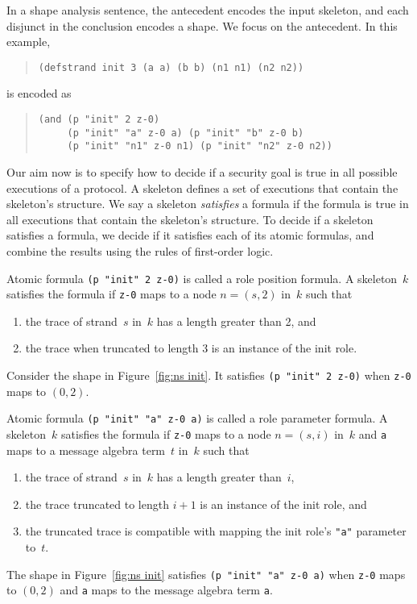 \documentclass[12pt]{article}
\begin{document}
In a shape analysis sentence, the antecedent encodes the input
skeleton, and each disjunct in the conclusion encodes a shape.
We focus on the antecedent.  In this example,

\begin{quote}
\begin{verbatim}
(defstrand init 3 (a a) (b b) (n1 n1) (n2 n2))
\end{verbatim}
\end{quote}
is encoded as
\begin{quote}
\begin{verbatim}
(and (p "init" 2 z-0)
     (p "init" "a" z-0 a) (p "init" "b" z-0 b)
     (p "init" "n1" z-0 n1) (p "init" "n2" z-0 n2))
\end{verbatim}
\end{quote}

Our aim now is to specify how to decide if a security goal is true in
all possible executions of a protocol.  A skeleton defines a set of
executions that contain the skeleton's structure.  We say a skeleton
\emph{satisfies} a formula if the formula is true in all executions
that contain the skeleton's structure.  To decide if a skeleton
satisfies a formula, we decide if it satisfies each of its atomic
formulas, and combine the results using the rules of first-order
logic.

Atomic formula \texttt{(p "init" 2 z-0)} is called a role position
formula.  A skeleton~$k$ satisfies the formula if \texttt{z-0} maps to
a node $n=(s,2)$ in~$k$ such that
\begin{enumerate}
\item the trace of strand~$s$ in~$k$ has a length greater than 2, and
\item the trace when truncated to length 3 is an instance of the init
  role.
\end{enumerate}
Consider the shape in Figure~\ref{fig:ns
  init}.  It satisfies \texttt{(p "init" 2 z-0)} when \texttt{z-0}
maps to $(0,2)$.

Atomic formula \texttt{(p "init" "a" z-0 a)} is called a role
parameter formula.  A skeleton~$k$ satisfies the formula if
\texttt{z-0} maps to a node $n=(s,i)$ in~$k$ and \texttt{a} maps to a
message algebra term~$t$ in~$k$ such that
\begin{enumerate}
\item the trace of strand~$s$ in~$k$ has a length greater than~$i$,
\item the trace truncated to length $i+1$ is an instance of the
  init role, and
\item the truncated trace is compatible with mapping the init role's
  \texttt{"a"} parameter to~$t$.
\end{enumerate}
The shape in Figure~\ref{fig:ns init} satisfies \texttt{(p "init" "a"
  z-0 a)} when \texttt{z-0} maps to $(0,2)$ and \texttt{a} maps to the
message algebra term \texttt{a}.
\end{document}
